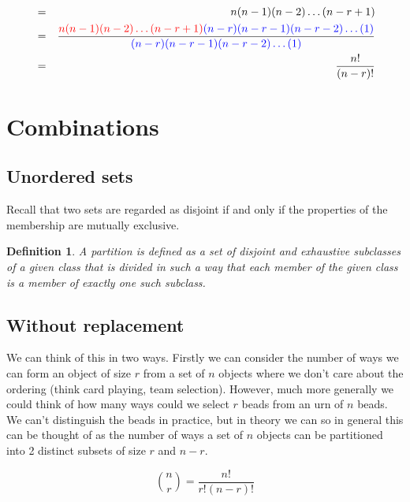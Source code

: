 \documentclass[12pt]{extbook}
\newtheorem{df}{Definition}[section]
\begin{document}
\begin{eqnarray*}
&=& n(n-1)(n-2)\ldots(n-r+1) \\
&=& \frac{ {\color{red} n(n-1)(n-2)\ldots(n-r+1)} {\color{blue} (n-r)(n-r-1)(n-r-2)\ldots(1)}}{{\color{blue} (n-r)(n-r-1)(n-r-2)\ldots(1)}} \\
&=& \frac{n!}{(n-r)!}
\end{eqnarray*}



 

 

\section{Combinations}

\subsection{Unordered sets}

Recall that two sets are regarded as disjoint if and only if the properties of the membership are mutually exclusive.  

\begin{df}
A \emph{partition} is defined as a set of disjoint and exhaustive subclasses of a given class that is divided in such a way that each member of the given class is a member of exactly one such subclass.
\end{df}
 

\subsection{Without replacement}

We can think of this in two ways.   Firstly we can consider the number of ways we can form an object of size $r$ from a set of  $n$ objects where we don't care about the ordering (think card playing, team selection).   However, much more generally we could think of how many ways could we select $r$ beads from an urn of $n$ beads.   We can't distinguish the beads in practice, but in theory we can so in general this can be thought of as the number of ways a set of $n$ objects can be partitioned into 2 distinct subsets of size $r$ and $n-r$.

\begin{equation}
{n \choose r} = \frac{n!}{r!(n-r)!}
\end{equation}
\end{document}
